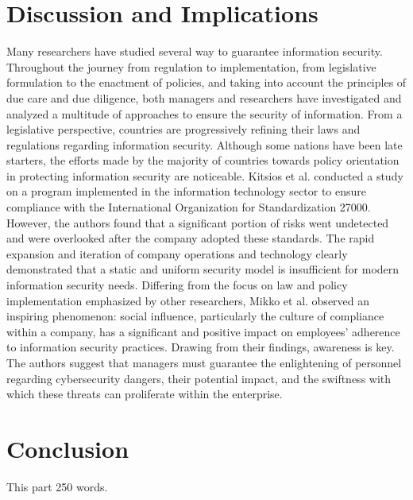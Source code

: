 \documentclass[
10pt, %
a4paper, %
oneside, %
headinclude,footinclude, %
BCOR5mm, %
]{scrartcl}
\begin{document}

\section{Discussion and Implications}
Many researchers have studied several way to guarantee information security. 
Throughout the journey from regulation to implementation, from legislative formulation to the enactment of policies, 
and taking into account the principles of due care and due diligence, 
both managers and researchers have investigated and analyzed a multitude of approaches to ensure the security of information.
From a legislative perspective, countries are progressively refining their laws and regulations regarding information security. 
Although some nations have been late starters, the efforts made by the majority of countries towards policy orientation in protecting information security are noticeable.
Kitsios et al. conducted a study on a program implemented in the information technology sector to ensure compliance with the International Organization for Standardization 27000.
However, the authors found that a significant portion of risks went undetected and were overlooked after the company adopted these standards. 
The rapid expansion and iteration of company operations and technology clearly demonstrated that a static and uniform security model is insufficient for modern information security needs\cite{kitsios2023iso}.
Differing from the focus on law and policy implementation emphasized by other researchers, Mikko et al. observed an inspiring phenomenon: 
social influence, particularly the culture of compliance within a company, has a significant and positive impact on employees' adherence to information security practices.
Drawing from their findings, awareness is key. The authors suggest that managers must guarantee the enlightening of personnel regarding cybersecurity dangers, 
their potential impact, and the swiftness with which these threats can proliferate within the enterprise\cite{siponen2010compliance}. 

\section{Conclusion}
This part 250 words.
\end{document}
